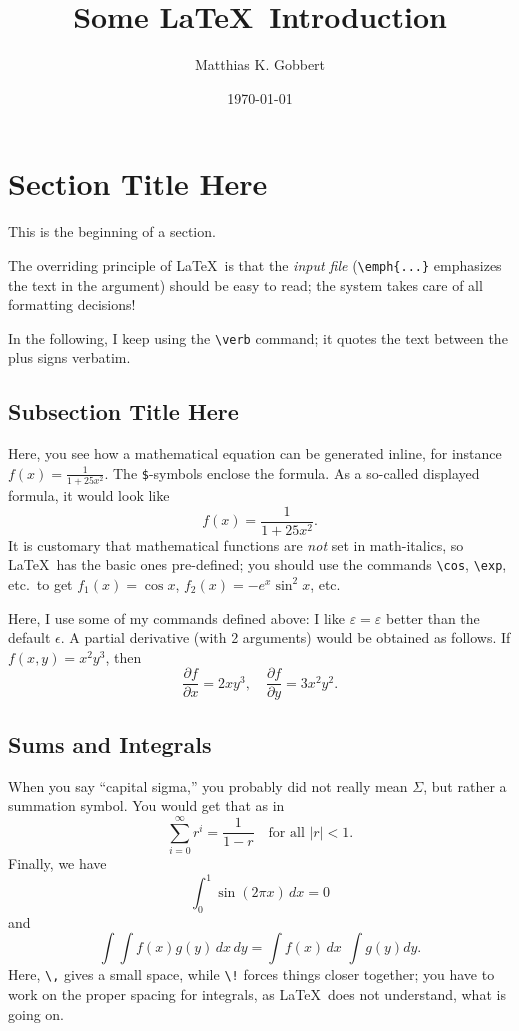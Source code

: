 \documentclass[12pt]{article}
\newcommand{\eps}{\varepsilon}
\newcommand{\der}[2]{\frac{\partial {#1}}{\partial {#2}}}
\begin{document}
\author{Matthias K. Gobbert}
\title{Some \LaTeX\ Introduction}
\date{\today}
\maketitle

\section{Section Title Here}
This is the beginning of a section.

The overriding principle of \LaTeX\ is that the \emph{input file}
(\verb+\emph{...}+ emphasizes the text in the argument) should be easy
to read; the system takes care of all formatting decisions!

In the following, I keep using the \verb+\verb+ command; it quotes the
text between the plus signs verbatim.

\subsection{Subsection Title Here}
Here, you see how a mathematical equation can be generated inline, for
instance $f(x) = \frac{1}{1+25 x^2}$.
The \verb+$+-symbols enclose the formula.
As a so-called displayed formula, it would look like
\begin{displaymath}
  f(x) = \frac{1}{1+25 x^2}.
\end{displaymath}
It is customary that mathematical functions are \emph{not} set in math-italics,
so \LaTeX\ has the basic ones pre-defined; you should use the commands
\verb+\cos+, \verb+\exp+, etc.\ to get $f_1(x) = \cos x$,
$f_2(x) = - e^x \sin^2 x$, etc.

Here, I use some of my commands defined above: I like $\eps = \varepsilon$
better than the default $\epsilon$. A partial derivative (with 2 arguments)
would be obtained as follows. If $f(x,y) = x^2 y^3$, then 
\begin{displaymath}
  \der{f}{x} = 2 x y^3, \quad \der{f}{y} = 3 x^2 y^2.
\end{displaymath}

\subsection{Sums and Integrals}
When you say ``capital sigma,'' you probably did not really mean $\Sigma$,
but rather a summation symbol. You would get that as in
\begin{displaymath}
  \sum_{i=0}^{\infty} r^i = \frac{1}{1 - r} \quad \mbox{for all $|r| < 1$}.
\end{displaymath}
Finally, we have
\begin{displaymath}
  \int_0^1 \sin(2 \pi x) \, dx = 0
\end{displaymath}
and
\begin{displaymath}
  \int \! \! \int f(x) g(y) \, dx \, dy = \int f(x) \, dx \,\, \int g(y) dy.
\end{displaymath}
Here, \verb+\,+ gives a small space, while \verb+\!+ forces things closer
together; you have to work on the proper spacing for integrals, as \LaTeX\
does not understand, what is going on.
\end{document}
